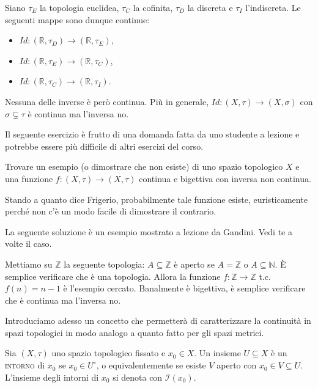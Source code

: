 \documentclass{article}
\begin{document}
\begin{ex}
	Siano $\tau_E$ la topologia euclidea, $\tau_C$ la cofinita, $\tau_D$ la
	discreta e $\tau_I$ l'indiscreta. Le seguenti mappe sono dunque continue:
    \begin{itemize}
	\item $Id:(\mathbb{R}, \tau_D) \rightarrow (\mathbb{R}, \tau_E)$,
    \item $Id:(\mathbb{R}, \tau_E) \rightarrow (\mathbb{R}, \tau_C)$,
    \item $Id:(\mathbb{R}, \tau_C) \rightarrow (\mathbb{R}, \tau_I)$.
    \end{itemize}
    Nessuna delle inverse è però continua. Più in generale, $Id: (X, \tau)
    \rightarrow (X, \sigma)$ con $\sigma \subsetneq \tau$ è continua ma
    l'inversa no.
\end{ex}

\begin{exc}
	Il seguente esercizio è frutto di una domanda fatta da uno studente a
	lezione e potrebbe essere più difficile di altri esercizi del corso.

    \marginpar{\warningsign}
	Trovare un esempio (o dimostrare che non esiste) di uno spazio topologico
	$X$ e una funzione $f: (X, \tau) \rightarrow (X, \tau)$ continua e bigettiva
	con inversa non continua.

    Stando a quanto dice Frigerio, probabilmente tale funzione esiste,
    euristicamente perché non c'è un modo facile di dimostrare il contrario.
\end{exc}

\begin{sol}
	La seguente soluzione è un esempio mostrato a lezione da Gandini. Vedi te a volte il caso.

	Mettiamo su $\mathbb{Z}$ la seguente topologia: $A \subseteq \mathbb{Z}$ è aperto se $A=\mathbb{Z}$ o $A \subseteq \mathbb{N}$. È semplice verificare che è una topologia. Allora la funzione $f: \mathbb{Z} \rightarrow \mathbb{Z}$ t.c. $f(n)=n-1$ è l'esempio cercato. Banalmente è bigettiva, è semplice verificare che è continua ma l'inversa no.
\end{sol}

Introduciamo adesso un concetto che permetterà di caratterizzare la continuità
in spazi topologici in modo analogo a quanto fatto per gli spazi metrici.

\begin{defn}
	Sia $(X, \tau)$ uno spazio topologico fissato e $x_0 \in X$. Un insieme $U
	\subseteq X$ è un \textsc{intorno} di $x_0$ se $x_0 \in
	U^{\circ}$, o equivalentemente se esiste $V$ aperto con $x_0 \in V
	\subseteq U$. L'insieme degli intorni di $x_0$ si denota con
	$\mathcal{I}(x_0)$.
\end{defn}
\end{document}
